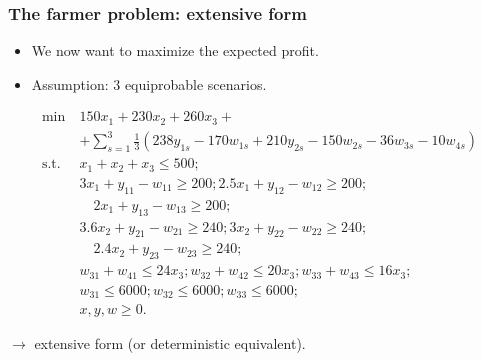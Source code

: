 \documentclass[aspectratio=169]{beamer}
\def\blue{\color{blue}}
\def\red{\color{red}}
\begin{document}
\begin{frame}
\frametitle{The farmer problem: extensive form}

\begin{itemize}
	\item 
We now want to maximize the {\red expected profit}.
\item
Assumption: 3 equiprobable scenarios.
\end{itemize}
\begin{footnotesize}
\begin{align*}
\min\ & 150x_1 + 230x_2 + 260x_3 +\\
& + \sum_{s = 1}^3 \frac{1}{3}(238y_{1s} - 170w_{1s} + 210y_{2s} - 150w_{2s} -
36w_{3s} - 10w_{4s}) \\
\text{s.t. } & x_1 + x_2 + x_3 \leq 500; \\
& 3x_1 + y_{11} - w_{11} \geq 200; 2.5x_1 + y_{12} - w_{12} \geq 200; \\
& \quad{}  2x_1 + y_{13} - w_{13} \geq 200; \\
& 3.6x_2 + y_{21} - w_{21} \geq 240; 3x_2 + y_{22} - w_{22} \geq
240;\\
& \quad{} 2.4x_2 + y_{23} - w_{23} \geq 240; \\
& w_{31} + w_{41} \leq 24 x_3; w_{32} + w_{42} \leq 20 x_3; w_{33} +
w_{43} \leq 16 x_3; \\
& w_{31} \leq 6000; w_{32} \leq 6000; w_{33} \leq 6000; \\
& x, y, w \geq 0.
\end{align*}
\end{footnotesize}
$\rightarrow$ {\blue extensive form} (or {\blue deterministic equivalent}).

\end{frame}
\end{document}

